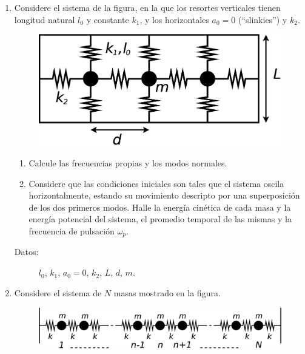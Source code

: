 \documentclass[11pt,spanish,a4paper]{article}
\begin{document}
\begin{enumerate}
\item Considere el sistema de la figura, en la que los resortes verticales
tienen longitud natural $l_{0}$ y constante $k_{1}$, y los horizontales
$a_{0}=0$ (``slinkies'') y $k_{2}$.
\begin{figure}[H]
\centering{}\includegraphics[clip,scale=0.25]{ej1-10}
\end{figure}
\begin{enumerate}
\item Calcule las frecuencias propias y los modos normales. 
\item Considere que las condiciones iniciales son tales que el sistema oscila
horizontalmente, estando su movimiento descripto por una superposición
de los dos primeros modos. Halle la energía cinética de cada masa
y la energía potencial del sistema, el promedio temporal de las mismas
y la frecuencia de pulsación $\omega_{p}$. \end{enumerate}
\begin{description}
\item [{Datos:}] $l_{0}$, $k_{1}$, $a_{0}=0$, $k_{2}$, $L$, $d$,
$m$.
\end{description}



\item Considere el sistema de $N$ masas mostrado en la figura. 
\begin{figure}[H]
\begin{centering}
\includegraphics[clip,scale=0.25]{ej1-11}
\par\end{centering}

\end{figure}



\end{enumerate}
\end{document}
